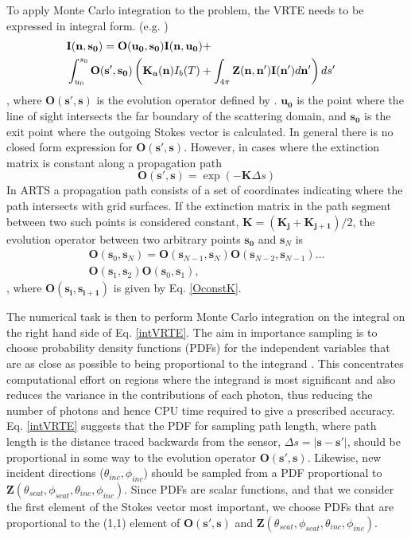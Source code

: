 To apply Monte Carlo integration to the problem, the VRTE needs to be expressed in integral form. (e.g. \cite{hochstadt:64})
\begin{eqnarray}
\lefteqn{\mathbf{I(n,s_0)}=\mathbf{O(u_0,s_0)I(n,u_0)}+}\nonumber\\
& \int_{u_0}^{s_0}\mathbf{O(s',s_0)}\left(\mathbf{K_a(n)}I_b(T) +\int_{4\pi}\mathbf{Z(n,n')}\mathbf{I(n')}d\mathbf{n'}\right)ds'\nonumber
\end{eqnarray}
\begin{equation}
\label{intVRTE}
\end{equation}
, where $\mathbf{O(s',s)}$ is the evolution operator defined by
\cite{landi:85}. $\mathbf{u_0}$ is the point where the line of sight intersects
the far boundary of the scattering domain, and $\mathbf{s_0}$ is the
exit point where the outgoing Stokes vector is calculated.
In general there is no closed form expression for $\mathbf{O(s',s)}$.
However, in cases where the extinction matrix is constant along a
propagation path
\begin{equation}
\mathbf{O(s',s)}=\exp\left(-\mathbf{K}\Delta s\right)
\label{OconstK}
\end{equation}
In ARTS a propagation path consists of a set of coordinates
indicating where the path intersects with grid surfaces.  If the
extinction matrix in the path segment between two such points is
considered constant, $\mathbf{K}=(\mathbf{K_j}+\mathbf{K_{j+1}})/2$,
the evolution operator between two arbitrary points $\mathbf{s_0}$ and
$\mathbf{s}_N$ is
\begin{eqnarray}
\mathbf{O}(\mathbf{s}_0,\mathbf{s}_N) =
\mathbf{O}(\mathbf{s}_{N-1},\mathbf{s}_N)
\mathbf{O}(\mathbf{s}_{N-2},\mathbf{s}_{N-1}) \dots \nonumber\\
\mathbf{O}(\mathbf{s}_1,\mathbf{s}_2)\mathbf{O}(\mathbf{s}_0,\mathbf{s}_1),
\end{eqnarray}
, where $\mathbf{O(s_i,s_{i+1})}$ is given by Eq. \ref{OconstK}.

The numerical task is then to perform Monte Carlo
integration on the integral on the right hand side of
Eq. \ref{intVRTE}.
The aim in importance sampling is to choose probability density functions
(PDFs) for the independent variables that are
as close as possible to being proportional to the integrand
\cite{liu:01}. This concentrates computational effort on regions where
the integrand is most significant and also reduces the variance in the contributions of each photon, thus reducing
the number of photons and hence CPU time required to give a
prescribed accuracy.  Eq. \ref{intVRTE} suggests that the PDF for
sampling path length, where path length is the distance traced backwards
from the sensor, $\Delta s=\left|\mathbf{s}-\mathbf{s'}\right|$, should be proportional in some way to the evolution
operator $\mathbf{O(s',s)}$. Likewise, new incident directions
($\theta_{inc},\phi_{inc}$) should be sampled from a PDF proportional
to
$\mathbf{Z}(\theta_{scat},\phi_{scat},\theta_{inc},\phi_{inc})$.
Since PDFs are scalar functions, and that we consider the first element of the
Stokes vector most important, we choose PDFs that are proportional to the
(1,1) element of $\mathbf{O(s',s)}$ and $\mathbf{Z}(\theta_{scat},\phi_{scat},\theta_{inc},\phi_{inc})$. 
